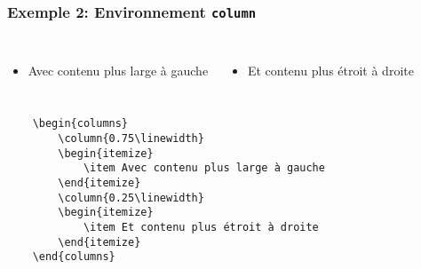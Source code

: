\documentclass[aspectratio=169]{beamer}
\begin{document}
\begin{frame}[fragile]
    \frametitle{Exemple 2: Environnement \texttt{column}}
    \begin{columns}
        \begin{itemize}
            \item Avec contenu plus large à gauche
        \end{itemize}
        \begin{itemize}
            \item Et contenu plus étroit à droite 
        \end{itemize}
    \end{columns}
{\scriptsize
\begin{verbatim}
    \begin{columns}
        \column{0.75\linewidth}
        \begin{itemize}
            \item Avec contenu plus large à gauche
        \end{itemize}
        \column{0.25\linewidth}
        \begin{itemize}
            \item Et contenu plus étroit à droite 
        \end{itemize}
    \end{columns}
\end{verbatim}
}
\end{frame}
\end{document}
